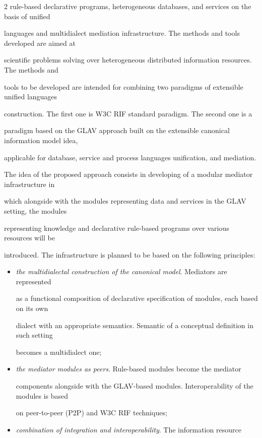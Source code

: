 \begin{multicols}{2}
rule-based declarative programs, heterogeneous databases, and services on the basis of unified 

languages and multidialect mediation infrastructure. The methods and tools developed are aimed at 

scientific problems solving over heterogeneous distributed information resources. The methods and 

tools to be developed are intended for combining two paradigms of extensible unified languages 

construction. The first one is W3C RIF standard paradigm. The second one is a 

paradigm based on the GLAV approach built on the extensible canonical information model idea, 

applicable for database, service and process languages unification, and mediation.



The idea of the proposed approach consists in developing of a modular mediator infrastructure in 

which alongside with the modules representing data and services in the GLAV setting, the modules 

representing knowledge and declarative rule-based programs over various resources will be 

introduced. The infrastructure is planned to be based on the following principles:

\begin{itemize}

\item \textit{the multidialectal construction of the canonical model}. Mediators are represented 

as a functional composition of declarative specification of modules, each based on its own 

dialect with an appropriate semantics. Semantic of a conceptual definition in such setting 

becomes a multidialect one;

\item \textit{the mediator modules as peers}. Rule-based modules become the mediator 

components alongside with the GLAV-based modules. Interoperability of the modules is based 

on peer-to-peer (P2P) and W3C RIF techniques;

\item \textit{combination of integration and interoperability}. The information resource 


\end{itemize}
\end{multicols}
